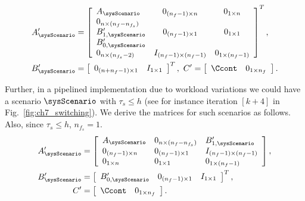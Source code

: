 \begin{align}
A_{\sysScenario}^{\prime} &= \left[ 
\begin{array}{lcc} 
A_{\sysScenario} & 0_{(n_{f}-1)\times n} & 0_{1\times n}\\
0_{n\times (n_{f}-n_{f_s})} &  & \\
B_{1,\sysScenario}^{\prime} & 0_{(n_{f}-1)\times 1} & 0_{1\times 1}\\
B_{0,\sysScenario}^{\prime} & & \\
0_{n\times (n_{f_s}-2)} & I_{(n_{f}-1)\times (n_{f}-1)} & 0_{1\times (n_{f}-1)}\\
\end{array}
\right]^T,\nonumber\\ 
B_{\sysScenario}^{\prime} &= \left[ \begin{array}{cc} 0_{(n+n_{f}-1) \times 1} & I_{1\times 1} \end{array} \right]^T,\ 
C^{\prime}= \left[ \begin{array}{cc} \Ccont &  0_{1\times n_{f}}
\end{array}
\right].  \nonumber  
\end{align}

Further, in a pipelined implementation due to workload variations we could have a scenario $\sysScenario$ with $\tau_s\le h$ (see for instance iteration $[k+4]$ in Fig.~\ref{fig:ch7_switching}). We derive the matrices for such scenarios as follows. 
Also, since $\tau_s\le h$, $n_{f_s}=1$.
\begin{align}
A_{\sysScenario}^{\prime} &= \left[ \begin{array}{lll} A_{\sysScenario} &  0_{n\times (n_{f}-n_{f_{s}})} & B_{1,\sysScenario}^{\prime} \\  
0_{(n_{f}-1)\times n} & 0_{(n_{f}-1)\times 1}  & I_{(n_{f}-1)\times (n_{f}-1)} \\
0_{1\times n} & 0_{1\times 1} & 0_{1\times (n_{f}-1)}\\
\end{array} \right],\nonumber\\ 
B_{\sysScenario}^{\prime} &= \left[ \begin{array}{ccc} B_{0,\sysScenario}^{\prime} & 0_{(n_{f}-1) \times 1} & I_{1\times 1} \end{array} \right]^T,\nonumber\\ 
C^{\prime} &= \left[ \begin{array}{cc} \Ccont &  0_{1\times n_{f}}\end{array} \right].  \nonumber  
\end{align}

